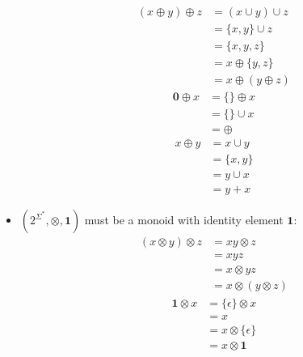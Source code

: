 \documentclass[a4paper,12pt]{ETHexercise}
\begin{document}
\begin{question}
\begin{subquestion}
\begin{itemize}
			      \begin{align}
				      \left(x \oplus y\right) \oplus z & = (x \cup y) \cup z                \\
				                                       & = \{x, y\} \cup z                  \\
				                                       & = \{x, y, z\}                      \\
				                                       & = x \oplus \{y, z\}                \\
				                                       & = x \oplus \left(y \oplus z\right)
			      \end{align}
			      \begin{align}
				      \mathbf{0} \oplus x & = \{\} \oplus x \\
				                          & = \{\} \cup x   \\
				                          & = \oplus
			      \end{align}
			      \begin{align}
				      x \oplus y & = x \cup y \\
				                 & = \{x, y\} \\
				                 & = y \cup x \\
				                 & = y + x
			      \end{align}
			\item $(2^{\Sigma^*}, \otimes, \mathbf{1})$ must be a monoid with identity element $\mathbf{1}$:
			      \begin{align}
				      \left( x \otimes y \right) \otimes z & = xy \otimes z                       \\
				                                           & = xyz                                \\
				                                           & = x \otimes yz                       \\
				                                           & = x \otimes \left(y \otimes z\right)
			      \end{align}
			      \begin{align}
				      \mathbf{1} \otimes x & = \{\epsilon\} \otimes x \\
				                           & = x                      \\
				                           & = x \otimes \{\epsilon\} \\
				                           & = x \otimes \mathbf{1}
			      \end{align}

\end{itemize}
\end{subquestion}
\end{question}
\end{document}
